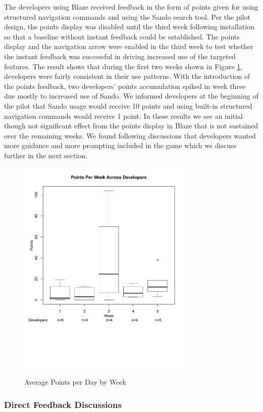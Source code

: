 \documentclass{sig-alternate}
\begin{document}
The developers using Blaze received feedback in the form of points given for using structured navigation commands and using the Sando search tool\cite{Shepherd2012Sando}.  Per the pilot design, the points display was disabled until the third week following installation so that a baseline without instant feedback could be established.  The points display and the navigation arrow were enabled in the third week to test whether the instant feedback was successful in driving increased use of the targeted features. The result shows that during the first two weeks shown in Figure \ref{fig:pointsbyweek}, developers were fairly consistent in their use patterns.  With the introduction of the points feedback, two developers' points accumulation spiked in week three due mostly to increased use of Sando.   We informed developers at the beginning of the pilot that Sando usage would receive 10 points and using built-in structured navigation commands would receive 1 point.  In these results we see an initial though not significant effect from the points display in Blaze that is not sustained over the remaining weeks.  We found following discussions that developers wanted more guidance and more prompting included in the game which we discuss further in the next section.

\begin{figure}
	\includegraphics[width=3.3in]{pointsbyweek_ann.pdf}
	\caption{Average Points per Day by Week}
	\label{fig:pointsbyweek}
\end{figure}

\subsubsection{Direct Feedback Discussions}
\end{document}
